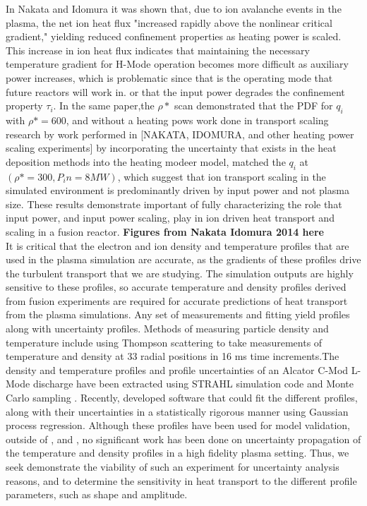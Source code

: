 \documentclass{article}
\begin{document}
In Nakata and Idomura it was shown that, due to ion avalanche events in the plasma, the net ion heat flux "increased rapidly above the nonlinear critical gradient," yielding reduced confinement properties as heating power is scaled. This increase in ion heat flux indicates that maintaining the necessary temperature gradient for H-Mode operation becomes more difficult as auxiliary power increases, which is problematic since that is the operating mode that future reactors will work in. or that the input power degrades the confinement property $\tau_i$. In the same paper,the $\rho*$ scan demonstrated that the PDF for $q_i$ with $\rho* = 600$, and without a heating pows work done in transport scaling research by work performed in [NAKATA, IDOMURA, and other heating power scaling experiments] by incorporating the uncertainty that exists in the heat deposition methods into the heating modeer model, matched the $q_i$ at $(\rho* = 300, P_in = 8MW)$, which suggest that ion transport scaling in the simulated environment is predominantly driven by input power and not plasma size. These results demonstrate important of fully characterizing the role that input power, and input power scaling, play in ion driven heat transport and scaling in a fusion reactor. \textbf{Figures from Nakata Idomura 2014 here}\\

It is critical that the electron and ion density and temperature profiles that are used in the plasma simulation are accurate, as the gradients of  these profiles drive the turbulent transport that we are studying. The simulation outputs are highly sensitive to these profiles, so accurate temperature and density profiles derived from fusion experiments are required for accurate predictions of heat transport from the plasma simulations. Any set of measurements and fitting yield profiles along with uncertainty profiles. Methods of measuring particle density and temperature include using Thompson scattering to take measurements of temperature and density at 33 radial positions in 16 ms time increments\cite{howard_quantitative_2012}.The density and temperature profiles and profile uncertainties of an Alcator C-Mod L-Mode discharge have been extracted using STRAHL simulation code and Monte Carlo sampling \cite{howard_quantitative_2012}. Recently, \cite{m.a._chilenski_et_al_improved_2015} developed software that could fit the different profiles, along with their uncertainties in a statistically rigorous manner using Gaussian process regression. Although these profiles have been used for model validation, outside of \cite{m.a._chilenski_et_al_improved_2015}, and \cite{Varis}, no significant work has been done on uncertainty propagation of the temperature and density profiles in a high fidelity plasma setting. Thus, we seek demonstrate the viability of such an experiment for uncertainty analysis reasons, and to determine the sensitivity in heat transport to the different profile parameters, such as shape and amplitude.
\end{document}
